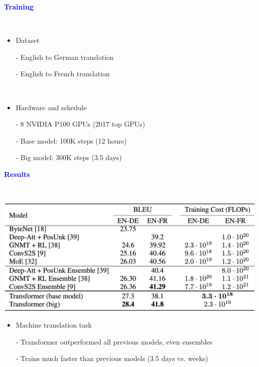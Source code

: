 \documentclass[professionalfont]{beamer}
\begin{document}
\begin{frame}
\begin{center}
    { \textbf{\textcolor{blue}{ {\fontsize{12}{14}\selectfont Training} }} }
\end{center}
\\[0.3cm]

{\fontsize{10}{14}\selectfont 
\begin{itemize}
    \item Dataset

    - English to German translation

    - English to French translation

    \\[0.4cm]
    
    \item Hardware and schedule

    - 8 NVIDIA P100 GPUs (2017 top GPUs)

    - Base model: 100K steps (12 hours)

    - Big model: 300K steps (3.5 days)
\end{itemize}
}

\end{frame}

\begin{frame}

\begin{center}
    { \textbf{\textcolor{blue}{ {\fontsize{12}{14}\selectfont Results} }} }
\end{center}
\\[0.3cm]

\begin{center}
    \includegraphics[width=1.0\textwidth]{table/2.png}
\end{center}

{\fontsize{10}{14}\selectfont 
\begin{itemize}
    \item Machine translation task

    - Transformer outperformed all previous models, even ensembles

    - Trains much faster than previous models (3.5 days vs. weeks)

\end{itemize}
}

\end{frame}
\end{document}
